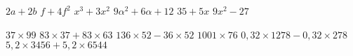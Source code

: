 \documentclass[../Cours.tex]{subfiles}
\begin{document}
\begin{questions}
    \vspace{-2em}
    \begin{multicols}{3}
        \question $2a + 2b$
        \question $f + 4f^2$
        \question $x^3 + 3x^2$
        \question $9\alpha^2 + 6\alpha + 12$
        \question $35 + 5x$
        \question $9x^2 - 27$
    \end{multicols} 

    \vspace{-2em}
    \begin{multicols}{3}
        \question $37 \times 99$
        \question $83 \times 37 + 83 \times 63$
        \question $136 \times 52 - 36 \times 52$
        \question $1001 \times 76$
        \question $0,32 \times 1278 - 0,32 \times 278$
        \question $5,2 \times 3456 + 5,2 \times 6544$
    \end{multicols}
\end{questions}

\clearpage
\CORRECTIONS 
\end{document}
